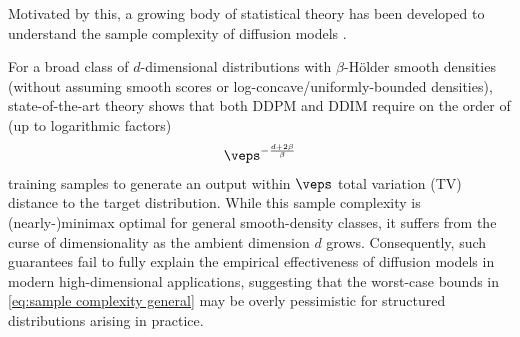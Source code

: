 Motivated by this, a growing body of statistical theory has been developed to understand the sample complexity of diffusion models \citep{shah2023learning,oko2023diffusionmodelsminimaxoptimal,chen2024learning,cole2024score,li2024good,dou2024optimalscorematchingoptimal}.

For a broad class of $d$-dimensional distributions with $\beta$-H\"older smooth densities (without assuming smooth scores or log-concave/uniformly-bounded densities), state-of-the-art theory shows that both DDPM \citep{zhang2024minimaxoptimalityscorebaseddiffusion} and DDIM \citep{cai2025minimaxoptimalityprobabilityflow} require on the order of  (up to logarithmic factors)
\begin{align}\label{eq:sample complexity general}
\veps^{-\frac{d+2\beta}{\beta}}
\end{align}
training samples to generate an output within $\veps$ total variation (TV) distance to the target distribution.
While this sample complexity is (nearly-)minimax optimal for general smooth-density classes, it suffers from the curse of dimensionality as the ambient dimension $d$ grows. Consequently, such guarantees fail to fully explain the empirical effectiveness of diffusion models in modern high-dimensional applications, suggesting that the worst-case bounds in \eqref{eq:sample complexity general} may be overly pessimistic for structured distributions arising in practice.
